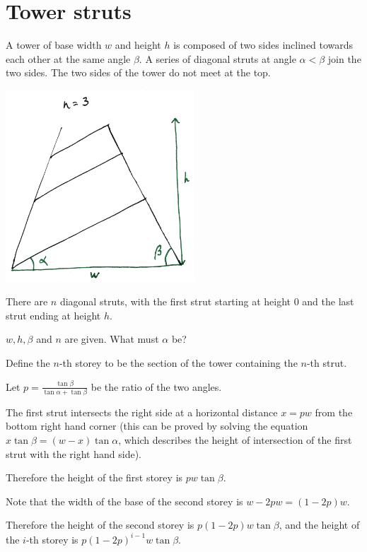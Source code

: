\documentclass[12pt]{article}
\begin{document}
\section*{Tower struts}

\begin{mdframed}
  A tower of base width $w$ and height $h$ is composed of two sides inclined towards each other at
  the same angle $\beta$. A series of diagonal struts at angle $\alpha < \beta$ join the two
  sides. The two sides of the tower do not meet at the top.

  \includegraphics[width=200pt]{img/puzzles-tower-struts.png}

  There are $n$ diagonal struts, with the first strut starting at height 0 and the last strut
  ending at height $h$.

  $w, h, \beta$ and $n$ are given. What must $\alpha$ be?
\end{mdframed}
Define the $n$-th storey to be the section of the tower containing the $n$-th strut.

Let $p = \frac{\tan\beta}{\tan\alpha + \tan\beta}$ be the ratio of the two angles.

The first strut intersects the right side at a horizontal distance $x = pw$ from the bottom right
hand corner (this can be proved by solving the equation $x\tan\beta = (w - x)\tan\alpha$, which
describes the height of intersection of the first strut with the right hand side).

Therefore the height of the first storey is $pw\tan\beta$.

Note that the width of the base of the second storey is $w - 2pw = (1 - 2p)w$.

Therefore the height of the second storey is $p(1 - 2p)w\tan\beta$, and the height of the $i$-th
storey is $p(1 - 2p)^{i-1}w\tan\beta$.
\end{document}
